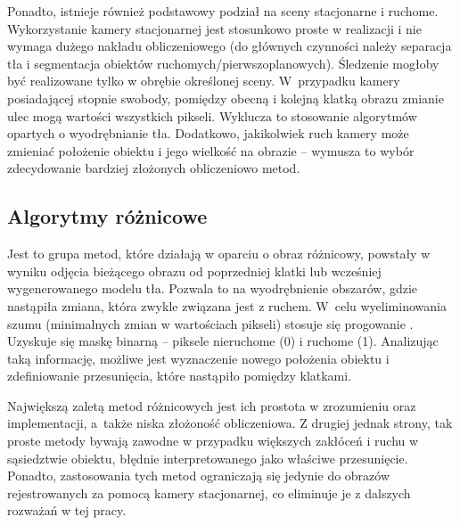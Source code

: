 Ponadto, istnieje również podstawowy podział na sceny stacjonarne i ruchome. 
Wykorzystanie kamery stacjonarnej jest stosunkowo proste w realizacji i nie wymaga dużego nakładu obliczeniowego (do głównych czynności należy separacja tła i segmentacja obiektów ruchomych/pierwszoplanowych). Śledzenie mogłoby być realizowane tylko w obrębie określonej sceny.%
W~przypadku kamery posiadającej stopnie swobody, pomiędzy obecną i kolejną klatką obrazu zmianie ulec mogą wartości wszystkich pikseli. 
Wyklucza to stosowanie algorytmów opartych o wyodrębnianie tła. 
Dodatkowo, jakikolwiek ruch kamery może zmieniać położenie obiektu i jego wielkość na obrazie -- wymusza to wybór zdecydowanie bardziej złożonych obliczeniowo metod.

\subsection{Algorytmy różnicowe}

Jest to grupa metod, które działają w oparciu o obraz różnicowy, powstały w wyniku odjęcia bieżącego obrazu od poprzedniej klatki lub wcześniej wygenerowanego modelu tła.
Pozwala to na wyodrębnienie obszarów, gdzie nastąpiła zmiana, która zwykle związana jest z ruchem. 
W~celu wyeliminowania szumu (minimalnych zmian w wartościach pikseli) stosuje się progowanie \cite{Rosin}. 
Uzyskuje się maskę binarną -- piksele nieruchome (0) i ruchome (1). 
Analizując taką informację, możliwe jest wyznaczenie nowego położenia obiektu i zdefiniowanie przesunięcia, które nastąpiło pomiędzy klatkami. 

Największą zaletą metod różnicowych jest ich prostota w zrozumieniu oraz implementacji, a~także niska złożoność obliczeniowa. 
Z drugiej jednak strony, tak proste metody bywają zawodne w przypadku większych zakłóceń i ruchu w sąsiedztwie obiektu, błędnie interpretowanego jako właściwe przesunięcie. 
Ponadto, zastosowania tych metod ograniczają się jedynie do obrazów rejestrowanych za pomocą kamery stacjonarnej, co eliminuje je z dalszych rozważań w tej pracy. 


